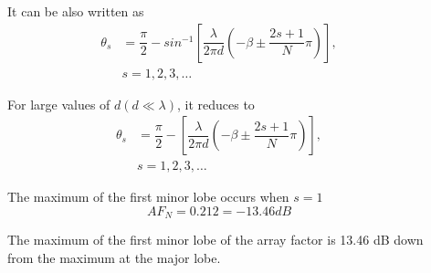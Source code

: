 \documentclass{beamer}
\begin{document}
	\begin{frame}
		\begin{description}
			\item[]
			\item[] It can be also written as
			\begin{align}
			\theta_s& = \dfrac{\pi}{2} - sin^{-1}\left[\dfrac{\lambda}{2\pi d}\left(-\beta \pm \dfrac{2s+1}{N}\pi\right)\right],\\
			&s = 1, 2, 3, \ldots\nonumber
			\end{align}
			\item[] For large values of $ d (d \ll \lambda) $, it reduces to
			\begin{align}
			\theta_s& = \dfrac{\pi}{2} - \left[\dfrac{\lambda}{2\pi d}\left(-\beta \pm \dfrac{2s+1}{N}\pi\right)\right],\\
			&s = 1, 2, 3, \ldots\nonumber
			\end{align}
			\item[] The maximum of the first minor lobe occurs when $ s = 1 $
			\begin{equation}
			AF_N = 0.212 = -13.46dB\nonumber
			\end{equation}
			\item[] The maximum of the first minor lobe of the array factor is	13.46 dB down from the maximum at the major lobe.
		\end{description}
	\end{frame}
	
\end{document}
